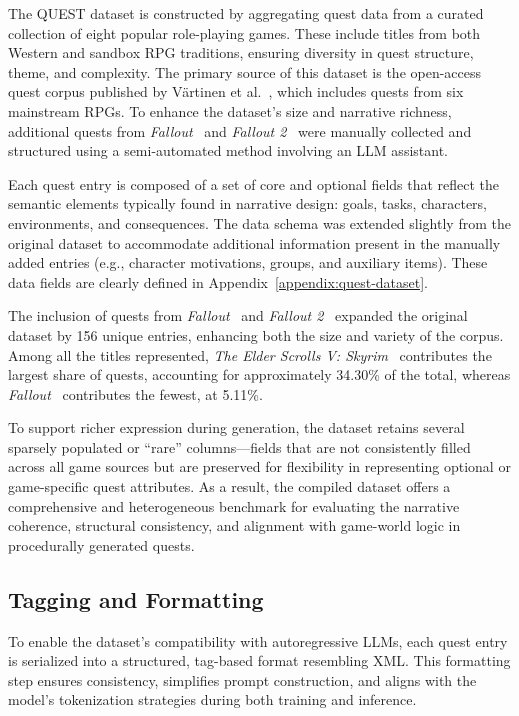The QUEST dataset is constructed by aggregating quest data from a curated collection
of eight popular role-playing games. These include titles from both Western and sandbox
RPG traditions, ensuring diversity in quest structure, theme, and complexity. The
primary source of this dataset is the open-access quest corpus published by V{\"a}rtinen et
al.~\cite{vartinen2022generating}, which includes quests from six mainstream RPGs. To enhance the dataset's
size and narrative richness, additional quests from \textit{Fallout}~\cite{fallout1} and \textit{Fallout 2}~\cite{fallout2} were
manually collected and structured using a semi-automated method involving an LLM
assistant.

Each quest entry is composed of a set of core and optional fields that reflect the semantic
elements typically found in narrative design: goals, tasks, characters, environments,
and consequences. The data schema was extended slightly from the original dataset to
accommodate additional information present in the manually added entries (e.g., character
motivations, groups, and auxiliary items). These data fields are clearly defined in
Appendix~\ref{appendix:quest-dataset}.

The inclusion of quests from \textit{Fallout}~\cite{fallout1} and \textit{Fallout 2}~\cite{fallout2} expanded the original dataset
by 156 unique entries, enhancing both the size and variety of the corpus. Among all the titles
represented, \textit{The Elder Scrolls V: Skyrim}~\cite{theelderscrollsvskyrim} contributes the
largest share of quests, accounting for approximately 34.30\% of the total, whereas \textit{Fallout}~\cite{fallout1} contributes the fewest, at 5.11\%.

To support richer expression during generation, the dataset retains several sparsely
populated or “rare” columns—fields that are not consistently filled across all game sources
but are preserved for flexibility in representing optional or game-specific quest attributes.
As a result, the compiled dataset offers a comprehensive and heterogeneous benchmark
for evaluating the narrative coherence, structural consistency, and alignment with game-world
logic in procedurally generated quests.

\subsection{Tagging and Formatting}

To enable the dataset's compatibility with autoregressive LLMs, each quest entry is serialized
into a structured, tag-based format resembling XML. This formatting step ensures
consistency, simplifies prompt construction, and aligns with the model's tokenization
strategies during both training and inference.

